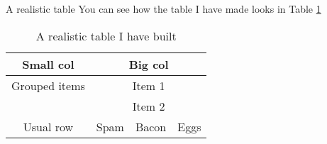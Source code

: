 
\begin{frame}{A realistic table}
    You can see how the table I have made looks in Table \ref{tab:table}
    
    \begin{table}
    \caption{A realistic table I have built}
    \label{tab:table}
    
    \begin{tabular}{|c||ccc|}
    \hline \hline
        Small col & \multicolumn{3}{|c|}{Big col} \\
    \hline
        Grouped items & \multicolumn{3}{|c|}{Item 1} \\
    \cline{2-4}
        & \multicolumn{3}{|c|}{Item 2} \\
    \hline
        Usual row & Spam & Bacon & Eggs \\
    \hline\hline
    \end{tabular}
    \end{table}
    
\end{frame}